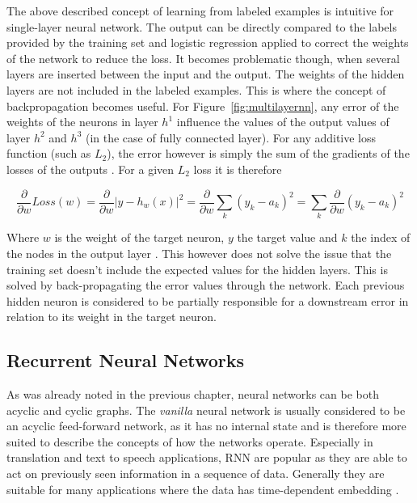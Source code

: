 The above described concept of learning from labeled examples is intuitive for single-layer neural network. The output can be
directly compared to the labels provided by the training set and logistic regression applied to correct the weights of
the network to reduce the loss. It becomes problematic though, when several layers are inserted between the input and
the output. The weights of the hidden layers are not included in the labeled examples. This is where the concept of
backpropagation becomes useful. For Figure~\ref{fig:multilayernn}, any error of the weights of the neurons in
layer $h^1$ influence the values of the output values of layer $h^2$ and $h^3$ (in the case of fully connected layer).
For any additive loss function (such as $L_2$), the error however is simply the sum of the gradients of the losses of
the outputs \cite[p.733f.]{russell2016artificial}. For a given $L_2$ loss it is therefore

\begin{equation}
    \frac{\partial}{\partial w} Loss(w) =  \frac{\partial}{\partial w} \vert y-h_w(x) \vert ^2 = \frac{\partial}{\partial w} \sum_k{(y_k - a_k)^2} =  \sum_k{\frac{\partial}{\partial w}(y_k - a_k)^2}
    \label{equ:errorssum}
\end{equation}

Where $w$ is the weight of the target neuron, $y$ the target value and $k$ the index of the nodes in the output layer \cite[p.733f.]{russell2016artificial}. This however does not
solve the issue that the training set doesn't include the expected values for the hidden layers. This is solved by
back-propagating the error values through the network. Each previous hidden neuron is considered to be partially
responsible for a downstream error in relation to its weight in the target neuron. 

\subsection{Recurrent Neural Networks}%
\label{sec:recurrent_neural_networks}

As was already noted in the previous chapter, neural networks can be both acyclic and cyclic graphs. The
\emph{vanilla} neural network is usually considered to be an acyclic feed-forward network, as it has no internal state and is
therefore more suited to describe the concepts of how the networks operate. Especially in translation and text to speech
applications, \ac{RNN} are popular as they are able to act on previously seen information in a sequence of
data. Generally they are suitable for many applications where the data has time-dependent embedding
\cite[p.373]{Goodfellow-et-al-2016}.

